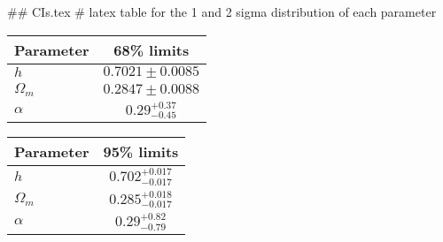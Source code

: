 ## CIs.tex
# latex table for the 1 and 2 sigma distribution of each parameter

\begin{tabular} { l  c}
 Parameter &  68\% limits\\
\hline
{\boldmath$h              $} & $0.7021\pm 0.0085          $\\
{\boldmath$\Omega_m       $} & $0.2847\pm 0.0088          $\\
{\boldmath$\alpha         $} & $0.29^{+0.37}_{-0.45}      $\\
\hline
\end{tabular}

\begin{tabular} { l  c}
 Parameter &  95\% limits\\
\hline
{\boldmath$h              $} & $0.702^{+0.017}_{-0.017}   $\\
{\boldmath$\Omega_m       $} & $0.285^{+0.018}_{-0.017}   $\\
{\boldmath$\alpha         $} & $0.29^{+0.82}_{-0.79}      $\\
\hline
\end{tabular}
